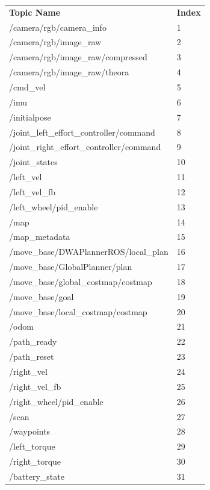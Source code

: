 \documentclass[12]{article}
\begin{document}
\begin{table}[h!]
  \begin{center}
    \label{tab:table1}
    \begin{tabular}{l|l}
      \textbf{Topic Name} & \textbf{Index}\\
    
    /camera/rgb/camera\_info & 1 \\
    /camera/rgb/image\_raw & 2 \\
    /camera/rgb/image\_raw/compressed & 3 \\
    /camera/rgb/image\_raw/theora & 4 \\
    /cmd\_vel & 5 \\
    /imu & 6 \\
    /initialpose & 7 \\
    /joint\_left\_effort\_controller/command & 8 \\
    /joint\_right\_effort\_controller/command & 9 \\
    /joint\_states & 10 \\
    /left\_vel & 11 \\
    /left\_vel\_fb & 12 \\
    /left\_wheel/pid\_enable & 13 \\
    /map & 14 \\
    /map\_metadata & 15 \\
    /move\_base/DWAPlannerROS/local\_plan & 16 \\
    /move\_base/GlobalPlanner/plan & 17 \\
    /move\_base/global\_costmap/costmap & 18 \\
    /move\_base/goal & 19 \\
    /move\_base/local\_costmap/costmap & 20 \\
    /odom & 21 \\
    /path\_ready & 22 \\
    /path\_reset & 23 \\
    /right\_vel & 24 \\
    /right\_vel\_fb & 25 \\
    /right\_wheel/pid\_enable & 26 \\
    /scan & 27 \\
    /waypoints & 28 \\
    /left\_torque & 29 \\
    /right\_torque & 30 \\
    /battery\_state & 31 \\
    \end{tabular}
  \end{center}
\end{table}
\end{document}
